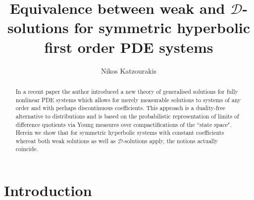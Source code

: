 \documentclass{amsart}
\theoremstyle{definition}
\numberwithin{equation}{section}
\begin{document}
\title[Equivalence between weak and ${\mathcal{D}}$-solutions for hyperbolic systems]{Equivalence between weak and ${\mathcal{D}}$-solutions for symmetric hyperbolic first order PDE systems}

\author{Nikos Katzourakis}
\address{Department of Mathematics and Statistics, University of Reading, Whiteknights, PO Box 220, Reading RG6 6AX, Berkshire, UK}

\date{}


\begin{abstract} In a recent paper the author introduced a new theory of generalised solutions for fully nonlinear PDE systems which allows for merely measurable solutions to systems of any order and with perhaps discontinuous coefficients. This approach is a duality-free alternative to distributions and is based on the probabilistic representation of limits of difference quotients via Young measures over compactifications of the ``state space". Herein we show that for  symmetric hyperbolic systems with constant coefficients whereat both weak solutions as well as ${\mathcal{D}}$-solutions apply, the notions actually coincide.
\end{abstract} 

\maketitle

\section{Introduction} \label{section1}
\end{document}
